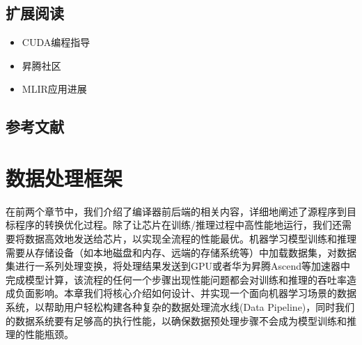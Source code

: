 \documentclass[letterpaper,10pt,english]{sphinxmanual}
\begin{document}
\section{扩展阅读}
\label{\detokenize{chapter_accelerator/summary:id2}}\begin{itemize}
\item {} 
\sphinxAtStartPar
CUDA编程指导
%
\begin{footnote}[35]\sphinxAtStartFootnote
{}
%
\end{footnote}

\item {} 
\sphinxAtStartPar
昇腾社区 %
\begin{footnote}[36]\sphinxAtStartFootnote
{}
%
\end{footnote}

\item {} 
\sphinxAtStartPar
MLIR应用进展 %
\begin{footnote}[37]\sphinxAtStartFootnote
{}
%
\end{footnote}

\end{itemize}


\section{参考文献}
\label{\detokenize{chapter_accelerator/summary:id3}}
\sphinxAtStartPar



\chapter{数据处理框架}
\label{\detokenize{chapter_data_processing/index:id1}}\label{\detokenize{chapter_data_processing/index::doc}}
\sphinxAtStartPar
在前两个章节中，我们介绍了编译器前后端的相关内容，详细地阐述了源程序到目标程序的转换优化过程。除了让芯片在训练/推理过程中高性能地运行，我们还需要将数据高效地发送给芯片，以实现全流程的性能最优。机器学习模型训练和推理需要从存储设备（如本地磁盘和内存、远端的存储系统等）中加载数据集，对数据集进行一系列处理变换，将处理结果发送到GPU或者华为昇腾Ascend等加速器中完成模型计算，该流程的任何一个步骤出现性能问题都会对训练和推理的吞吐率造成负面影响。本章我们将核心介绍如何设计、并实现一个面向机器学习场景的数据系统，以帮助用户轻松构建各种复杂的数据处理流水线(Data
Pipeline)，同时我们的数据系统要有足够高的执行性能，以确保数据预处理步骤不会成为模型训练和推理的性能瓶颈。
\end{document}
